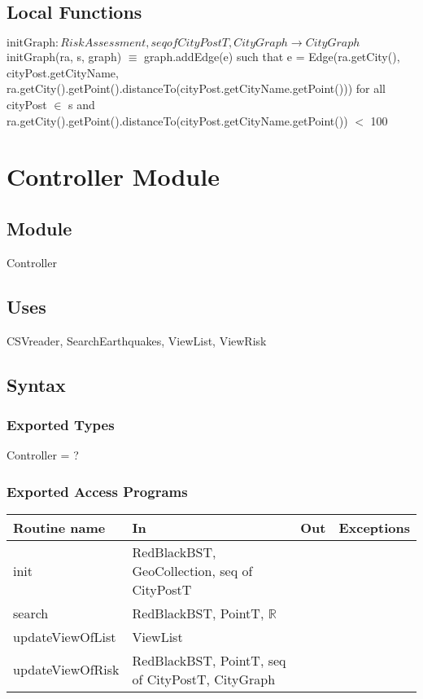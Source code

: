\documentclass[12pt]{article}
\begin{document}
\subsection*{Local Functions}
\noindent $\text{initGraph}: RiskAssessment, seq of CityPostT, CityGraph \rightarrow CityGraph$\\
\noindent initGraph(ra, s, graph) $\equiv$ graph.addEdge(e) such that e = Edge(ra.getCity(), cityPost.getCityName, ra.getCity().getPoint().distanceTo(cityPost.getCityName.getPoint())) for all cityPost $\in$ s and ra.getCity().getPoint().distanceTo(cityPost.getCityName.getPoint()) $<$ 100\\




\newpage

\section* {Controller Module}

\subsection* {Module}

Controller

\subsection* {Uses}

CSVreader, SearchEarthquakes, ViewList, ViewRisk

\subsection* {Syntax}

\subsubsection* {Exported Types}

Controller = ?

\subsubsection* {Exported Access Programs}

\begin{tabular}{| l | l | l | l |}
\hline
\textbf{Routine name} & \textbf{In} & \textbf{Out} & \textbf{Exceptions}\\
\hline
init & RedBlackBST, GeoCollection, seq of CityPostT &  &  ~\\
\hline
search & RedBlackBST, PointT, $\mathbb{R}$ &  &  ~\\
\hline
updateViewOfList & ViewList &  &  ~\\
\hline
updateViewOfRisk & RedBlackBST, PointT, seq of CityPostT, CityGraph &  &  ~\\
\hline
\end{tabular}
\end{document}
